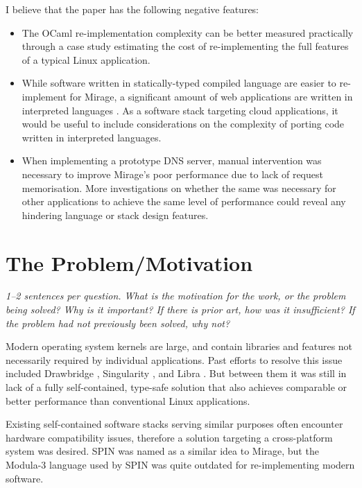 \documentclass[11pt]{article}
\begin{document}
I believe that the paper has the following negative features:
\begin{itemize}
	\item The OCaml re-implementation complexity can be better measured practically through a case study estimating the cost of re-implementing the full features of a typical Linux application.
	\item While software written in statically-typed compiled language are easier to re-implement for Mirage, a significant amount of web applications are written in interpreted languages \cite{prokhorenko2016web}. As a software stack targeting cloud applications, it would be useful to include considerations on the complexity of porting code written in interpreted languages.
	\item When implementing a prototype DNS server, manual intervention was necessary to improve Mirage's poor performance due to lack of request memorisation. More investigations on whether the same was necessary for other applications to achieve the same level of performance could reveal any hindering language or stack design features.
\end{itemize}

\section*{The Problem/Motivation}
\textsl{1--2 sentences per question. What is the motivation for the work, or the problem being solved? Why is it important? If there is prior art, how was it insufficient? If the problem had not previously been solved, why not?}

Modern operating system kernels are large, and contain libraries and features not necessarily required by individual applications. Past efforts to resolve this issue included Drawbridge \cite{porter2011rethinking}, Singularity \cite{hunt2007singularity}, and Libra \cite{ammons2007libra}. But between them it was still in lack of a fully self-contained, type-safe solution that also achieves comparable or better performance than conventional Linux applications. 

Existing self-contained software stacks \cite{engler1995exokernel} \cite{leslie1996design} serving similar purposes often encounter hardware compatibility issues, therefore a solution targeting a cross-platform system was desired. SPIN \cite{bershad1995extensibility} was named as a similar idea to Mirage, but the Modula-3 language used by SPIN was quite outdated for re-implementing modern software.
\end{document}
